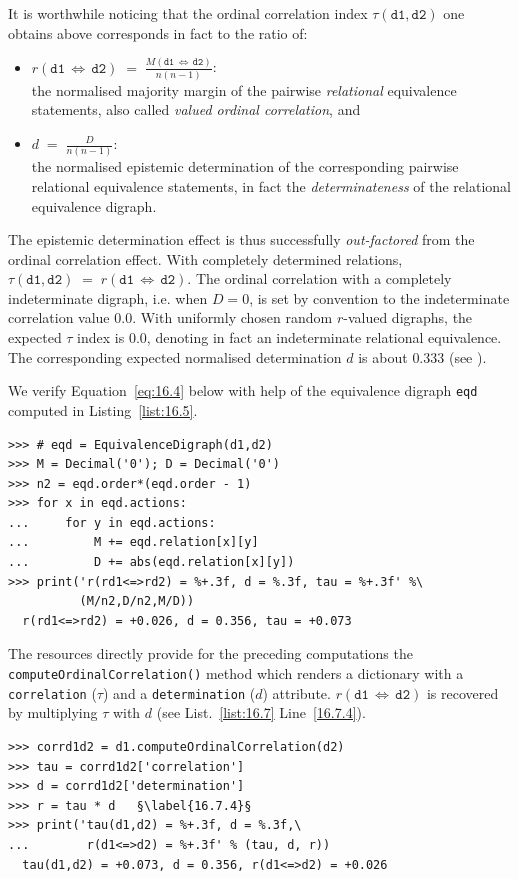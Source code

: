 It is worthwhile noticing that the ordinal correlation index $\tau(\mathtt{d1},\mathtt{d2})$ one obtains above corresponds in fact to the ratio of:
\begin{itemize}[topsep=2pt]
\item $r(\mathtt{d1}\,\Leftrightarrow\, \mathtt{d2}) \;=\; \frac{M(\mathtt{d1}\,\Leftrightarrow\, \mathtt{d2})}{n(n-1)}$:\\the normalised majority margin of the pairwise \emph{relational} equivalence statements, also called \emph{valued ordinal correlation}, and 
\item $d \;=\; \frac{D}{n(n-1)}$:\\ the normalised epistemic determination of the corresponding pairwise relational equivalence statements, in fact the \emph{determinateness} of the relational equivalence digraph.
\end{itemize}

The epistemic determination effect is thus successfully \emph{out-factored} from the ordinal correlation effect. With completely determined relations, $\tau(\mathtt{d1},\mathtt{d2}) \;=\; r(\mathtt{d1}\,\Leftrightarrow\, \mathtt{d2})$. The ordinal correlation with a completely indeterminate digraph, i.e. when $D = 0$, is set by convention to the indeterminate correlation value $0.0$. With uniformly chosen random $r$-valued digraphs, the expected $\tau$ index is $0.0$, denoting in fact an indeterminate relational equivalence. The corresponding expected normalised determination $d$ is about $0.333$ (see \citet{BIS-2012a}).

We verify Equation~\vref{eq:16.4} below with help of the equivalence digraph \texttt{eqd} computed in Listing~\vref{list:16.5}.
\begin{lstlisting}[caption={Computing the ordinal correlation index from the equivalence digraph},label=list:16.6]
>>> # eqd = EquivalenceDigraph(d1,d2)
>>> M = Decimal('0'); D = Decimal('0')
>>> n2 = eqd.order*(eqd.order - 1)
>>> for x in eqd.actions:
...     for y in eqd.actions:
...         M += eqd.relation[x][y]
...         D += abs(eqd.relation[x][y])
>>> print('r(rd1<=>rd2) = %+.3f, d = %.3f, tau = %+.3f' %\
          (M/n2,D/n2,M/D))   
  r(rd1<=>rd2) = +0.026, d = 0.356, tau = +0.073  
\end{lstlisting}

The \Digraph resources directly provide for the preceding computations the \texttt{compute\-OrdinalCorrelation()} method which renders a dictionary with a \texttt{correlation} ($\tau$) and a \texttt{determina\-tion} ($d$) attribute. $r(\mathtt{d1}\,\Leftrightarrow\, \mathtt{d2})$ is recovered by multiplying $\tau$ with $d$ (see List.~\vref{list:16.7} Line~\ref{16.7.4}). 
\begin{lstlisting}[caption={Computing the valued ordinal correlation index},label=list:16.7]
>>> corrd1d2 = d1.computeOrdinalCorrelation(d2)
>>> tau = corrd1d2['correlation']
>>> d = corrd1d2['determination']
>>> r = tau * d   §\label{16.7.4}§
>>> print('tau(d1,d2) = %+.3f, d = %.3f,\
...        r(d1<=>d2) = %+.3f' % (tau, d, r))
  tau(d1,d2) = +0.073, d = 0.356, r(d1<=>d2) = +0.026
\end{lstlisting}

